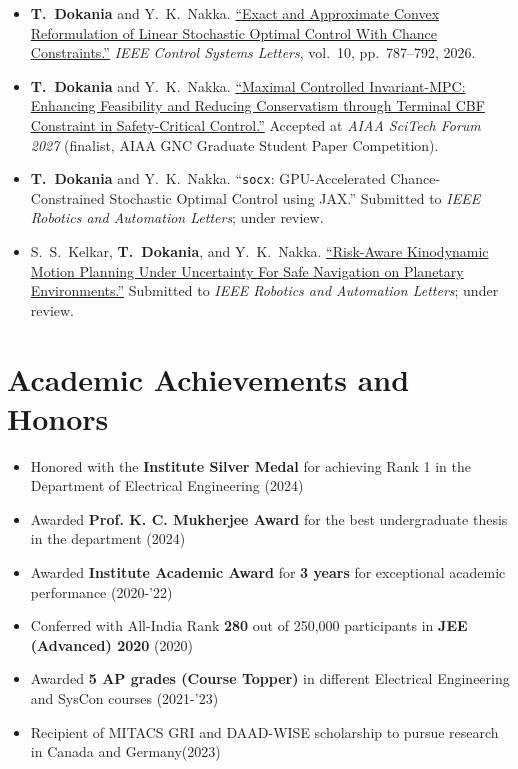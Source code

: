 \documentclass[10pt,letterpaper,sans]{moderncv}        %
\begin{document}
\begingroup
\hypersetup{urlcolor=black}
\begin{itemize}
    \item \textbf{T.~Dokania} and Y.~K.~Nakka.
    \href{https://doi.org/10.1109/LCSYS.2026.3701076}{``Exact and Approximate Convex Reformulation of Linear Stochastic Optimal Control With Chance Constraints.''}
    \textit{IEEE Control Systems Letters}, vol.~10, pp.~787--792, 2026.

    \item \textbf{T.~Dokania} and Y.~K.~Nakka.
    \href{https://arxiv.org/abs/2605.05575}{``Maximal Controlled Invariant-MPC: Enhancing Feasibility and Reducing Conservatism through Terminal CBF Constraint in Safety-Critical Control.''}
    Accepted at \textit{AIAA SciTech Forum 2027}
    (finalist, AIAA GNC Graduate Student Paper Competition).

    \item \textbf{T.~Dokania} and Y.~K.~Nakka.
    ``\texttt{socx}: GPU-Accelerated Chance-Constrained Stochastic Optimal Control using JAX.''
    Submitted to \textit{IEEE Robotics and Automation Letters}; under review.

    \item S.~S.~Kelkar, \textbf{T.~Dokania}, and Y.~K.~Nakka.
    \href{https://arxiv.org/abs/2608.11175}{``Risk-Aware Kinodynamic Motion Planning Under Uncertainty For Safe Navigation on Planetary Environments.''}
    Submitted to \textit{IEEE Robotics and Automation Letters}; under review.
\end{itemize}
\endgroup
\vspace{-0.25 cm}
\section{Academic Achievements and Honors}

\begin{itemize}
    \item Honored with the \textbf{Institute Silver Medal} for achieving Rank 1 in the Department of Electrical Engineering \hfill (2024)
    \item Awarded \textbf{Prof. K. C. Mukherjee Award} for the best undergraduate thesis in the department \hfill (2024)
    \item {Awarded \textbf{Institute Academic Award} for \textbf{3 years} for exceptional academic performance \hfill{{(2020-'22)}}} 
\item Conferred with All-India Rank \textbf{280} out of 250,000 participants in \textbf{JEE (Advanced) 2020} \hfill (2020)
\item Awarded \textbf{5 AP grades (Course Topper)} in different {Electrical Engineering and SysCon courses} \hfill (2021-'23)
\item Recipient of MITACS GRI and DAAD-WISE scholarship to pursue research in Canada and Germany\hfill (2023)
\end{itemize}
\end{document}
